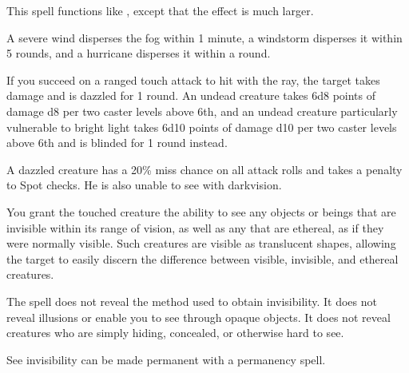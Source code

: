 \begin{spelleffect}
  This spell functions like , except that the effect is much larger.
\end{spelleffect}
\begin{spellnotes}
  A severe wind disperses the fog within 1 minute, a windstorm disperses it within 5 rounds, and a hurricane disperses it within a round.
\end{spellnotes}

\spellrng{\rngclose}
\begin{spelleffect}
  If you succeed on a ranged touch attack to hit with the ray, the target takes damage and is dazzled for 1 round. An undead creature takes 6d8 points of damage \add d8 per two caster levels above 6th, and an undead creature particularly vulnerable to bright light takes 6d10 points of damage \add d10 per two caster levels above 6th and is blinded for 1 round instead.
\end{spelleffect}
\begin{spellnotes}
  A dazzled creature has a 20\% miss chance on all attack rolls and takes a  penalty to Spot checks. He is also unable to see with darkvision.
\end{spellnotes}

\begin{spelleffect}
  You grant the touched creature the ability to see any objects or beings that are invisible within its range of vision, as well as any that are ethereal, as if they were normally visible. Such creatures are visible as translucent shapes, allowing the target to easily discern the difference between visible, invisible, and ethereal creatures.
\end{spelleffect}
\begin{spellnotes}
  The spell does not reveal the method used to obtain invisibility. It does not reveal illusions or enable you to see through opaque objects. It does not reveal creatures who are simply hiding, concealed, or otherwise hard to see.
  \par See invisibility can be made permanent with a permanency spell.
\end{spellnotes}


